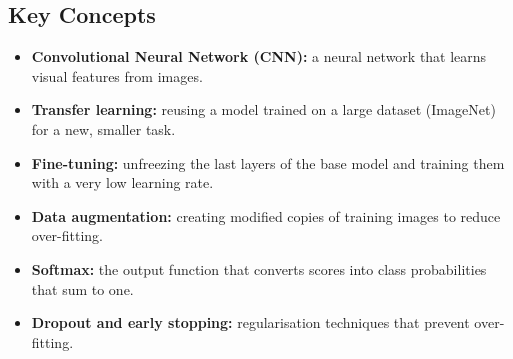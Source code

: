 \subsection{Key Concepts}
\begin{itemize}
  \item \textbf{Convolutional Neural Network (CNN):} a neural network that learns visual features from images.
  \item \textbf{Transfer learning:} reusing a model trained on a large dataset (ImageNet) for a new, smaller task.
  \item \textbf{Fine-tuning:} unfreezing the last layers of the base model and training them with a very low learning rate.
  \item \textbf{Data augmentation:} creating modified copies of training images to reduce over-fitting.
  \item \textbf{Softmax:} the output function that converts scores into class probabilities that sum to one.
  \item \textbf{Dropout and early stopping:} regularisation techniques that prevent over-fitting.
\end{itemize}
